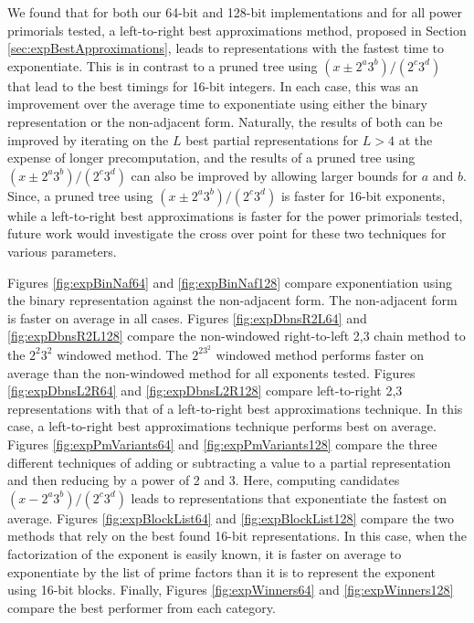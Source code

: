 \documentclass{ucalgthes1}
\theoremstyle{definition}
\begin{document}
We found that for both our 64-bit and 128-bit implementations and for all power primorials tested, a left-to-right best approximations method, proposed in Section \ref{sec:expBestApproximations}, leads to representations with the fastest time to exponentiate.  This is in contrast to a pruned tree using $(x \pm 2^a3^b)/(2^c3^d)$ that lead to the best timings for 16-bit integers.  In each case, this was an improvement over the average time to exponentiate using either the binary representation or the non-adjacent form.  Naturally, the results of both can be improved by iterating on the $L$ best partial representations for $L > 4$ at the expense of longer precomputation, and the results of a pruned tree using $(x \pm 2^a3^b)/(2^c3^d)$ can also be improved by allowing larger bounds for $a$ and $b$.  Since, a pruned tree using $(x \pm 2^a3^b)/(2^c3^d)$ is faster for 16-bit exponents, while a left-to-right best approximations is faster for the power primorials tested, future work would investigate the cross over point for these two techniques for various parameters.

Figures \ref{fig:expBinNaf64} and \ref{fig:expBinNaf128} compare exponentiation using the binary representation against the non-adjacent form.  The non-adjacent form is faster on average in all cases.  Figures \ref{fig:expDbnsR2L64} and \ref{fig:expDbnsR2L128} compare the non-windowed right-to-left 2,3 chain method to the $2^2 3^2$ windowed method.  The $2^23^2$ windowed method performs faster on average than the non-windowed method for all exponents tested.  Figures \ref{fig:expDbnsL2R64} and \ref{fig:expDbnsL2R128} compare left-to-right 2,3 representations with that of a left-to-right best approximations technique.  In this case, a left-to-right best approximations technique performs best on average.  Figures \ref{fig:expPmVariants64} and \ref{fig:expPmVariants128} compare the three different techniques of adding or subtracting a value to a partial representation and then reducing by a power of 2 and 3.  Here, computing candidates $(x-2^a3^b)/(2^c3^d)$ leads to representations that exponentiate the fastest on average.  Figures \ref{fig:expBlockList64} and \ref{fig:expBlockList128} compare the two methods that rely on the best found 16-bit representations.  In this case, when the factorization of the exponent is easily known, it is faster on average to exponentiate by the list of prime factors than it is to represent the exponent using 16-bit blocks.  Finally, Figures \ref{fig:expWinners64} and \ref{fig:expWinners128} compare the best performer from each category.
\end{document}
